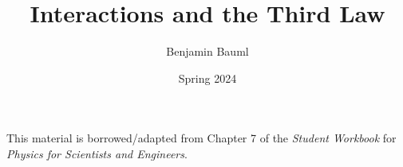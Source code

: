 \documentclass[]{article}
\title{Interactions and the Third Law}
\author{Benjamin Bauml}
\date{Spring 2024}
\newcommand{\FileDepth}{../..}
\begin{document}
\maketitle
\begin{center}
	This material is borrowed/adapted from Chapter 7 of the \textit{Student Workbook} for \textit{Physics for Scientists and Engineers}.
\end{center}


\end{document}
